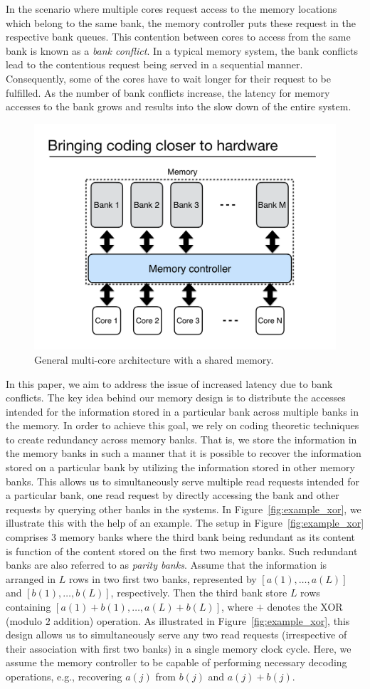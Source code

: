 In the scenario where multiple cores request access to the memory locations which belong to the same bank, the memory controller puts these request in the respective bank queues. This contention between cores to access from 
the same bank is known as a {\em bank conflict}. In a typical memory system, the bank conflicts lead to the contentious request being served in a sequential manner. Consequently, some of the cores have to wait longer for their request to be fulfilled. As the number of bank conflicts increase, the latency for memory accesses to the bank grows and results into the slow down of the entire system. \\ 
\begin{figure}[t!]
\centering
\includegraphics[width=0.6\linewidth]{fig/multicore-sys.pdf}
\caption{General multi-core architecture with a shared memory.}
\label{fig:multicore_arch}
\end{figure}
In this paper, we aim to address the issue of increased latency due to bank conflicts. The key idea behind our memory design is to distribute the accesses intended for the information stored in a particular bank across multiple banks in the memory. In order to achieve this goal, we rely on coding theoretic techniques to create redundancy across memory banks. That is, we store the information in the memory banks in such a manner that it is possible to recover the information stored on a particular bank by utilizing the information stored in other memory banks. This allows us to simultaneously serve multiple read requests intended for a particular bank, one read request by directly accessing the bank and other requests by querying other banks in the systems. In Figure~\ref{fig:example_xor}, we illustrate this with the help of an example. The setup in Figure~\ref{fig:example_xor} comprises $3$ memory banks where the third bank being redundant as its content is function of the content stored on the first two memory banks. Such redundant banks are also referred to as {\em parity banks}. Assume that the information is arranged in $L$ rows in two first two banks, represented by $[a(1),\ldots, a(L)]$ and $[b(1),\ldots, b(L)]$, respectively. Then the third bank store $L$ rows containing $[a(1) + b(1),\ldots, a(L) + b(L)]$, where $+$ denotes the XOR (modulo $2$ addition) operation. As illustrated in Figure~\ref{fig:example_xor}, this design allows us to simultaneously serve any two read requests (irrespective of their association with first two banks) in a single memory clock cycle. Here, we assume the memory controller to be capable of performing necessary decoding operations, e.g., recovering $a(j)$ from $b(j)$ and $a(j) + b(j)$.

